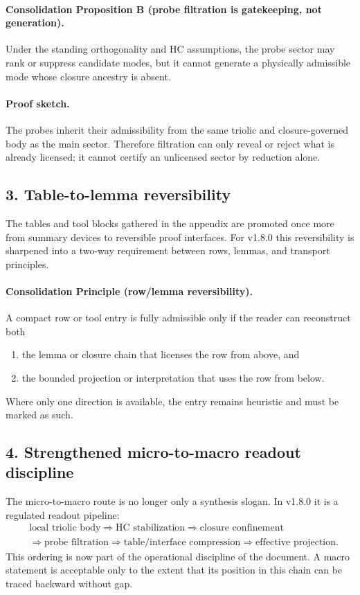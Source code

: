 \paragraph{Consolidation Proposition B (probe filtration is gatekeeping, not generation).}
Under the standing orthogonality and HC assumptions, the probe sector may rank or
suppress candidate modes, but it cannot generate a physically admissible mode
whose closure ancestry is absent.

\paragraph{Proof sketch.}
The probes inherit their admissibility from the same triolic and closure-governed
body as the main sector. Therefore filtration can only reveal or reject what is
already licensed; it cannot certify an unlicensed sector by reduction alone.

\subsection*{3. Table-to-lemma reversibility}
The tables and tool blocks gathered in the appendix are promoted once more from
summary devices to reversible proof interfaces. For v1.8.0 this reversibility
is sharpened into a two-way requirement between rows, lemmas, and transport
principles.

\paragraph{Consolidation Principle (row/lemma reversibility).}
A compact row or tool entry is fully admissible only if the reader can reconstruct
both
\begin{enumerate}[leftmargin=2em,label=(\alph*)]
  \item the lemma or closure chain that licenses the row from above, and
  \item the bounded projection or interpretation that uses the row from below.
\end{enumerate}
Where only one direction is available, the entry remains heuristic and must be
marked as such.

\subsection*{4. Strengthened micro-to-macro readout discipline}
The micro-to-macro route is no longer only a synthesis slogan. In v1.8.0 it is
a regulated readout pipeline:
\[
\begin{aligned}
&\text{local triolic body} \Longrightarrow \text{HC stabilization} \Longrightarrow \text{closure confinement}\\
&\Longrightarrow \text{probe filtration} \Longrightarrow \text{table/interface compression} \Longrightarrow \text{effective projection}.
\end{aligned}
\]
This ordering is now part of the operational discipline of the document. A macro
statement is acceptable only to the extent that its position in this chain can be
traced backward without gap.

